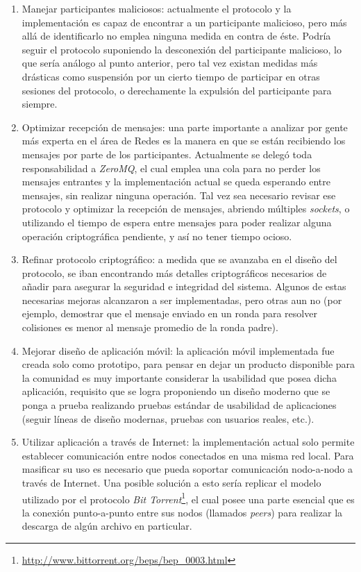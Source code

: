 \begin{enumerate}
    \item Manejar participantes maliciosos: actualmente el protocolo y la 
    implementación es capaz de encontrar a un participante malicioso, pero más 
    allá de identificarlo no emplea ninguna medida en contra de éste. Podría 
    seguir el protocolo suponiendo la desconexión del participante malicioso, 
    lo que sería análogo al punto anterior, pero tal vez existan medidas más 
    drásticas como suspensión por un cierto tiempo de participar en otras 
    sesiones del protocolo, o derechamente la expulsión del participante para 
    siempre. 
    
    \item Optimizar recepción de mensajes: una parte importante a analizar por 
    gente más experta en el área de Redes es la manera en que se están 
    recibiendo los mensajes por parte de los participantes. Actualmente se 
    delegó toda responsabilidad a \emph{ZeroMQ}, el cual emplea una cola para 
    no perder los mensajes entrantes y la implementación actual se queda 
    esperando entre mensajes, sin realizar ninguna operación. Tal vez sea 
    necesario revisar ese protocolo y optimizar la recepción de mensajes, 
    abriendo múltiples \emph{sockets}, o utilizando el tiempo de espera entre 
    mensajes para poder realizar alguna operación criptográfica pendiente, y 
    así no tener tiempo ocioso.
    
    \item Refinar protocolo criptográfico: a medida que se avanzaba en el 
    diseño del protocolo, se iban encontrando más detalles criptográficos 
    necesarios de añadir para asegurar la seguridad e integridad del sistema. 
    Algunos de estas necesarias mejoras alcanzaron a ser implementadas, pero 
    otras aun no (por ejemplo, demostrar que el mensaje enviado en un ronda 
    para resolver colisiones es menor al mensaje promedio de la ronda padre).
    
    \item Mejorar diseño de aplicación móvil: la aplicación móvil implementada 
    fue creada solo como prototipo, para pensar en dejar un producto 
    disponible para la comunidad es muy importante considerar la usabilidad 
    que posea dicha aplicación, requisito que se logra proponiendo un diseño 
    moderno que se ponga a prueba realizando pruebas estándar de usabilidad de 
    aplicaciones (seguir líneas de diseño modernas, pruebas con usuarios 
    reales, etc.).
    
    \item Utilizar aplicación a través de Internet: la implementación actual 
    solo permite establecer comunicación entre nodos conectados en una misma 
    red local. Para masificar su uso es necesario que pueda soportar 
    comunicación nodo-a-nodo a través de Internet. Una posible solución a esto 
    sería replicar el modelo utilizado por el protocolo 
    \emph{Bit Torrent}\footnote{\url{http://www.bittorrent.org/beps/bep_0003.html}}, el cual posee una parte esencial que es la conexión 
    punto-a-punto entre sus nodos (llamados \emph{peers}) para realizar la 
    descarga de algún archivo en particular.
    

\end{enumerate}
